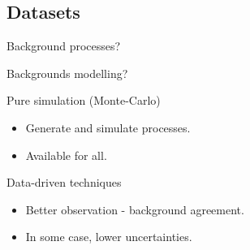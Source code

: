 %

%

\subsection*{Datasets}
%

\begin{frame}
\begin{center}
\LARGE Background processes?
\end{center}
\end{frame}
\addtocounter{framenumber}{-1}



\begin{frame}
\begin{center}
\Large Backgrounds modelling?
\end{center}

\begin{minipage}[t]{.45\textwidth}
\begin{block}{Pure simulation (Monte-Carlo)}
\begin{itemize}
\item Generate and simulate processes.
\item Available for all.
\end{itemize}
\end{block}
\end{minipage}
\hfill
\begin{minipage}[t]{.45\textwidth}
\begin{block}{Data-driven techniques}
\begin{itemize}
\item Better observation - background agreement.
\item In some case, lower uncertainties.
\end{itemize}
\end{block}
\end{minipage}
\end{frame}

